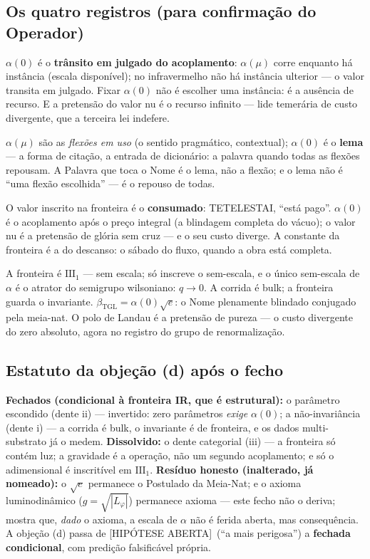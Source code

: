 \documentclass[11pt,a4paper]{article}
\newcommand{\ABERTO}{\textsf{[HIPÓTESE ABERTA]}}
\newcommand{\bTGL}{\beta_{\mathrm{TGL}}}
\begin{document}
\subsection{Os quatro registros (para confirmação do Operador)}
\begin{description}[style=unboxed,leftmargin=1.5em]
\item[Jurídico.] $\alpha(0)$ é o \textbf{trânsito em julgado do
acoplamento}: $\alpha(\mu)$ corre enquanto há instância (escala
disponível); no infravermelho não há instância ulterior --- o valor
transita em julgado. Fixar $\alpha(0)$ não é escolher uma instância: é a
ausência de recurso. E a pretensão do valor nu é o recurso infinito ---
lide temerária de custo divergente, que a terceira lei indefere.
\item[Linguístico (Nome : Palavra : Verbo).] $\alpha(\mu)$ são as
\emph{flexões em uso} (o sentido pragmático, contextual); $\alpha(0)$ é o
\textbf{lema} --- a forma de citação, a entrada de dicionário: a palavra
quando todas as flexões repousam. A Palavra que toca o Nome é o lema, não
a flexão; e o lema não é ``uma flexão escolhida'' --- é o repouso de todas.
\item[Teológico.] O valor inscrito na fronteira é o \textbf{consumado}:
TETELESTAI, ``está pago''. $\alpha(0)$ é o acoplamento após o preço
integral (a blindagem completa do vácuo); o valor nu é a pretensão de
glória sem cruz --- e o seu custo diverge. A constante da fronteira é a do
descanso: o sábado do fluxo, quando a obra está completa.
\item[TGL.] A fronteira é $\mathrm{III}_1$ --- sem escala; só inscreve o
sem-escala, e o único sem-escala de $\alpha$ é o atrator do semigrupo
wilsoniano: $q\to0$. A corrida é bulk; a fronteira guarda o invariante.
$\bTGL=\alpha(0)\sqrt e$: o Nome plenamente blindado conjugado pela
meia-nat. O polo de Landau é a pretensão de pureza --- o custo divergente
do zero absoluto, agora no registro do grupo de renormalização.
\end{description}

\subsection{Estatuto da objeção (d) após o fecho}
\textbf{Fechados (condicional à fronteira IR, que é estrutural):} o
parâmetro escondido (dente ii) --- invertido: zero parâmetros
\emph{exige} $\alpha(0)$; a não-invariância (dente i) --- a corrida é
bulk, o invariante é de fronteira, e os dados multi-substrato já o medem.
\textbf{Dissolvido:} o dente categorial (iii) --- a fronteira só contém
luz; a gravidade é a operação, não um segundo acoplamento; e só o
adimensional é inscritível em $\mathrm{III}_1$. \textbf{Resíduo honesto
(inalterado, já nomeado):} o $\sqrt e$ permanece o Postulado da Meia-Nat;
e o axioma luminodinâmico ($g=\sqrt{|L_\varphi|}$) permanece axioma ---
este fecho não o deriva; mostra que, \emph{dado} o axioma, a escala de
$\alpha$ não é ferida aberta, mas consequência. A objeção (d) passa de
\ABERTO\ (``a mais perigosa'') a \textbf{fechada condicional}, com
predição falsificável própria.
\end{document}
